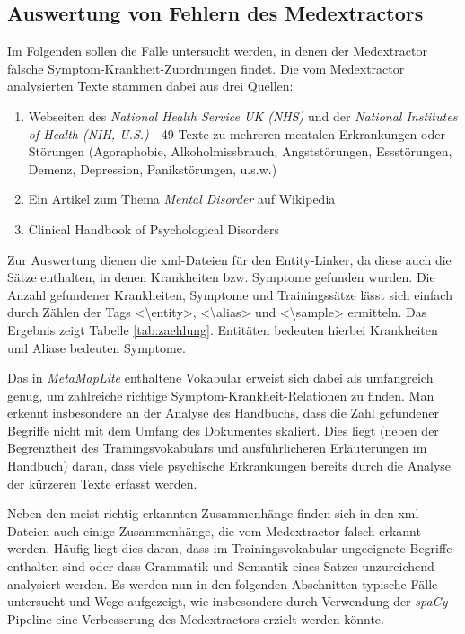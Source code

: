 \subsection{Auswertung von Fehlern des Medextractors}
\label{subsec:detaillierteAuswertung} 

Im Folgenden sollen die Fälle untersucht werden, in denen der Medextractor falsche Symptom-Krankheit-Zuordnungen findet. Die vom Medextractor analysierten Texte stammen dabei aus drei Quellen:

\begin{enumerate}
	\item Webseiten des \emph{National Health Service UK (NHS)} und der \emph{National Institutes of Health (NIH, U.S.)} - 49 Texte zu mehreren mentalen Erkrankungen oder Störungen (Agoraphobie, Alkoholmissbrauch, Angststörungen, Essstörungen, Demenz, Depression, Panikstörungen, u.s.w.) \cite{nhs_webpage} \cite{nih_webpage}
	\item Ein Artikel zum Thema \emph{Mental Disorder} auf Wikipedia \cite{wikimentaldisorder}
	\item Clinical Handbook of Psychological Disorders \cite{clinicalhandbook}
\end{enumerate}

Zur Auswertung dienen die xml-Dateien für den Entity-Linker, da diese auch die Sätze enthalten, in denen Krankheiten bzw. Symptome gefunden wurden. Die Anzahl gefundener Krankheiten, Symptome und Trainingssätze lässt sich einfach durch Zählen der Tags <\textbackslash entity>, <\textbackslash alias> und <\textbackslash sample> ermitteln. Das Ergebnis zeigt Tabelle \ref{tab:zaehlung}. Entitäten bedeuten hierbei Krankheiten und Aliase bedeuten Symptome.

Das in \emph{MetaMapLite} enthaltene Vokabular erweist sich dabei als umfangreich genug, um zahlreiche richtige Symptom-Krankheit-Relationen zu finden. Man erkennt insbesondere an der Analyse des Handbuchs, dass die Zahl gefundener Begriffe nicht mit dem Umfang des Dokumentes skaliert. Dies liegt (neben der Begrenztheit des Trainingsvokabulars und ausführlicheren Erläuterungen im Handbuch) daran, dass viele psychische Erkrankungen bereits durch die Analyse der kürzeren Texte erfasst werden.

Neben den meist richtig erkannten Zusammenhänge finden sich in den xml-Dateien auch einige Zusammenhänge, die vom Medextractor falsch erkannt werden. Häufig liegt dies daran, dass im Trainingsvokabular ungeeignete Begriffe enthalten sind oder dass Grammatik und Semantik eines Satzes unzureichend analysiert werden. Es werden nun in den folgenden Abschnitten typische Fälle untersucht und Wege aufgezeigt, wie insbesondere durch Verwendung der \emph{spaCy}-Pipeline eine Verbesserung des Medextractors erzielt werden könnte.

